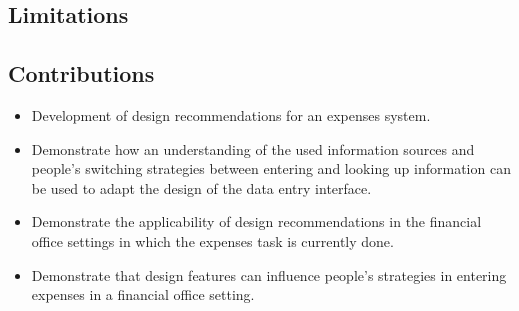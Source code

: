 \subsection{Limitations}

\subsection{Contributions}
\begin{itemize}
\item
Development of design recommendations for an expenses system.
\item
Demonstrate how an understanding of the used information sources and people's switching strategies between entering and looking up information can be used to adapt the design of the data entry interface. 
\item
Demonstrate the applicability of design recommendations in the financial office settings in which the expenses task is currently done. 
\item
Demonstrate that design features can influence people's strategies in entering expenses in a financial office setting.
\end{itemize}

